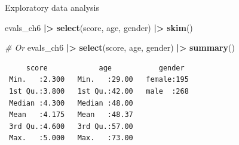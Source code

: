 \documentclass[
  ignorenonframetext,
]{beamer}
\newenvironment{Shaded}{\begin{snugshade}}{\end{snugshade}}
\newcommand{\CommentTok}[1]{\textcolor[rgb]{0.56,0.35,0.01}{\textit{#1}}}
\newcommand{\FunctionTok}[1]{\textcolor[rgb]{0.13,0.29,0.53}{\textbf{#1}}}
\newcommand{\NormalTok}[1]{#1}
\newcommand{\SpecialCharTok}[1]{\textcolor[rgb]{0.81,0.36,0.00}{\textbf{#1}}}
\begin{document}
\begin{frame}[fragile]{Exploratory data analysis}
\label{exploratory-data-analysis-10}
\normalsize

\begin{Shaded}
\begin{Highlighting}[]
\NormalTok{evals\_ch6 }\SpecialCharTok{|\textgreater{}} 
  \FunctionTok{select}\NormalTok{(score, age, gender) }\SpecialCharTok{|\textgreater{}} 
  \FunctionTok{skim}\NormalTok{()}
\end{Highlighting}
\end{Shaded}

\normalsize

\begin{Shaded}
\begin{Highlighting}[]
\CommentTok{\# Or}
\NormalTok{evals\_ch6 }\SpecialCharTok{|\textgreater{}} 
  \FunctionTok{select}\NormalTok{(score, age, gender) }\SpecialCharTok{|\textgreater{}} 
  \FunctionTok{summary}\NormalTok{()}
\end{Highlighting}
\end{Shaded}

\begin{verbatim}
     score            age           gender   
 Min.   :2.300   Min.   :29.00   female:195  
 1st Qu.:3.800   1st Qu.:42.00   male  :268  
 Median :4.300   Median :48.00               
 Mean   :4.175   Mean   :48.37               
 3rd Qu.:4.600   3rd Qu.:57.00               
 Max.   :5.000   Max.   :73.00               
\end{verbatim}
\end{frame}
\end{document}
